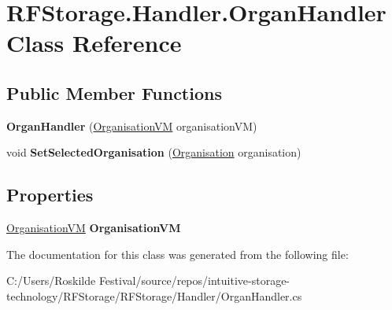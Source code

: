 \hypertarget{class_r_f_storage_1_1_handler_1_1_organ_handler}{}\section{R\+F\+Storage.\+Handler.\+Organ\+Handler Class Reference}
\label{class_r_f_storage_1_1_handler_1_1_organ_handler}
\subsection*{Public Member Functions}
\begin{DoxyCompactItemize}
\item 
\mbox{\label{class_r_f_storage_1_1_handler_1_1_organ_handler_a07c4561b410d04108aae70058198594d}} 
{\bfseries Organ\+Handler} (\mbox{\hyperlink{class_r_f_storage_1_1_view_model_1_1_organisation_v_m}{Organisation\+VM}} organisation\+VM)
\item 
\mbox{\label{class_r_f_storage_1_1_handler_1_1_organ_handler_a59b58722dcd0aaf34938a8754f067c3e}} 
void {\bfseries Set\+Selected\+Organisation} (\mbox{\hyperlink{class_r_f_storage_1_1_model_1_1_organisation}{Organisation}} organisation)
\end{DoxyCompactItemize}
\subsection*{Properties}
\begin{DoxyCompactItemize}
\item 
\mbox{\label{class_r_f_storage_1_1_handler_1_1_organ_handler_a0eb6949a3a1c995b365d27596b0533e2}} 
\mbox{\hyperlink{class_r_f_storage_1_1_view_model_1_1_organisation_v_m}{Organisation\+VM}} {\bfseries Organisation\+VM}
\end{DoxyCompactItemize}


The documentation for this class was generated from the following file\+:\begin{DoxyCompactItemize}
\item 
C\+:/\+Users/\+Roskilde Festival/source/repos/intuitive-\/storage-\/technology/\+R\+F\+Storage/\+R\+F\+Storage/\+Handler/Organ\+Handler.\+cs\end{DoxyCompactItemize}
